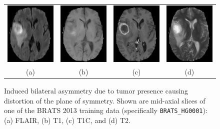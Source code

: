 \documentclass[preprint,authoryear,review,12pt]{elsarticle}
\begin{document}
\begin{figure}[h]
  \centering
  \begin{tabular}{cccc}
  \includegraphics[width=30mm]{Figures/BRATS_HG0001/BRATS_HG0001_FLAIR_slice93.png} &
  \includegraphics[width=30mm]{Figures/BRATS_HG0001/BRATS_HG0001_T1_slice93.png} &
  \includegraphics[width=30mm]{Figures/BRATS_HG0001/BRATS_HG0001_T1C_slice93.png} &
  \includegraphics[width=30mm]{Figures/BRATS_HG0001/BRATS_HG0001_T2_slice93.png} \\
  (a) & (b) &
  (c) & (d) \\
  \end{tabular}
  \caption{Induced bilateral asymmetry due to tumor presence causing
  distortion of the plane of symmetry.  Shown are mid-axial slices of
  one of the BRATS 2013 training data 
  (specifically {\tt BRATS\_HG0001}):  (a) FLAIR, (b) T1, (c) T1C, and
  (d) T2.  }
  \label{fig:asymmetry}
\end{figure}
\end{document}
